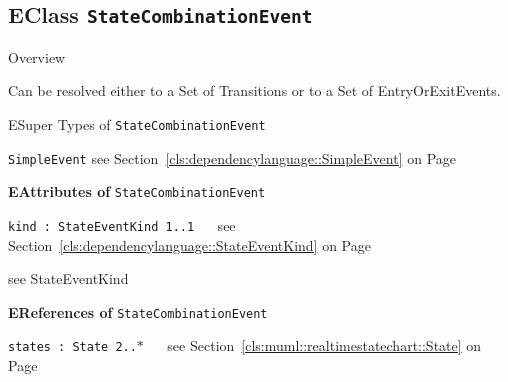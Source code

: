 \subsection{EClass \bfseries \texttt{StateCombinationEvent}\normalfont}
\label{cls:dependencylanguage::StateCombinationEvent} 
	
	\begin{longdescription}
		\item[Overview] 		
				

	

		Can be resolved either to a Set of Transitions or to a Set of EntryOrExitEvents.		
		\item[ESuper Types of \texttt{StateCombinationEvent}] ~
			\begin{longdescription}
				\item[\texttt{SimpleEvent}] see Section~\ref{cls:dependencylanguage::SimpleEvent} on Page~\pageref{cls:dependencylanguage::SimpleEvent}						\end{longdescription}
		
	
			\item[\textbf{EAttributes of} \texttt{StateCombinationEvent}] ~
			\begin{longdescription}
	\item[\texttt{kind : StateEventKind \symbol{"5B}1..1\symbol{"5D}
}] ~
	see Section~\ref{cls:dependencylanguage::StateEventKind} on Page~\pageref{cls:dependencylanguage::StateEventKind}
	
	\nopagebreak
		
				

	

		see StateEventKind		
			\end{longdescription}
			\item[\textbf{EReferences of} \texttt{StateCombinationEvent}] ~
			\begin{longdescription}
	\item[\texttt{states : State \symbol{"5B}2..$*$\symbol{"5D}
}] ~
	see Section~\ref{cls:muml::realtimestatechart::State} on Page~\pageref{cls:muml::realtimestatechart::State}
	
	\nopagebreak
		
				

	

	
			\end{longdescription}
	
	\end{longdescription}
	

